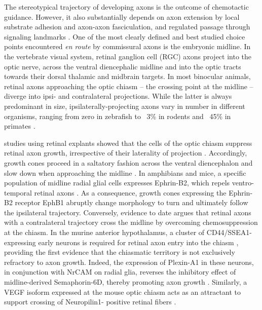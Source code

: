 The stereotypical trajectory of developing axons is the outcome of chemotactic guidance.
However, it also substantially depends on axon extension by local substrate adhesion and axon-axon fasciculation, and regulated passage through signaling landmarks \cite{raper2010cellular}.
One of the most clearly defined and best studied choice points encountered \emph{en route} by commissural axons is the embryonic midline.
In the vertebrate visual system, retinal ganglion cell (RGC) axons project into the optic nerve, across the ventral diencephalic midline and into the optic tracts towards their dorsal thalamic and midbrain targets.
In most binocular animals, retinal axons approaching the optic chiasm -- the crossing point at the midline -- diverge into ipsi- and contralateral projections.
While the latter is always predominant in size, ipsilaterally-projecting axons vary in number in different organisms, ranging from zero in zebrafish to ~3\% in rodents and ~45\% in primates \cite{jeffery2005variations}.

\Invitro{} studies using retinal explants showed that the cells of the optic chiasm suppress retinal axon growth, irrespective of their laterality of projection \cite{wizenmann1993differential,wang1995crossed,wang1996chemosuppression,kuwajima2012optic}.
Accordingly, growth cones proceed in a saltatory fashion across the ventral diencephalon and slow down when approaching the midline \cite{harris1987retinal,mason1997growth,hutson2002pathfinding}.
In amphibians and mice, a specific population of midline radial glial cells expresses Ephrin-B2, which repels ventro-temporal retinal
axons \cite{nakagawa2000ephrin,williams2003ephrin}.
As a consequence, growth cones expressing the Ephrin-B2 receptor EphB1 abruptly change morphology to turn and ultimately follow the ipsilateral trajectory.
Conversely, evidence to date argues that retinal axons with a contralateral trajectory cross the midline by overcoming chemosuppression at the chiasm.
In the murine anterior hypothalamus, a cluster of CD44/SSEA1-expressing early neurons is required for retinal axon entry into the chiasm \cite{sretavan1995disruption}, providing the first evidence that the chiasmatic territory is not exclusively refractory to axon growth.
Indeed, the expression of Plexin-A1 in these neurons, in conjunction with NrCAM on radial glia, reverses the inhibitory effect of midline-derived Semaphorin-6D, thereby promoting axon growth \cite{williams2006role,kuwajima2012optic}.
Similarly, a VEGF isoform expressed at the mouse optic chiasm acts as an attractant to support crossing of Neuropilin1- positive retinal fibers \cite{erskine2011vegf}.

